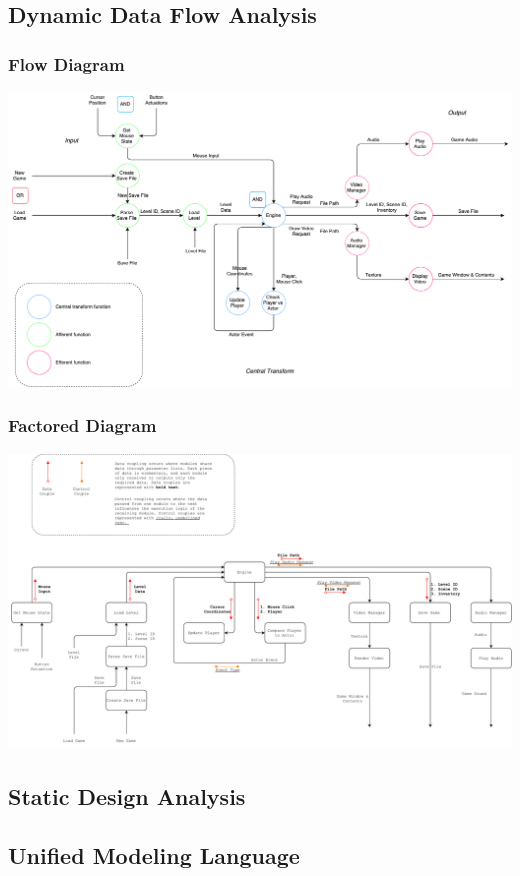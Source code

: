 \documentclass{article}
\begin{document}
	\subsection{Dynamic Data Flow Analysis}
		\subsubsection{Flow Diagram}
			\begin{center}
				\includegraphics[scale=0.35]{ddfFlow}
			\end{center}
		\subsubsection{Factored Diagram}
			\begin{center}
				\includegraphics[scale=0.35]{ddfFactored}
			\end{center}
	\subsection{Static Design Analysis}
	\subsection{Unified Modeling Language}
\end{document}
